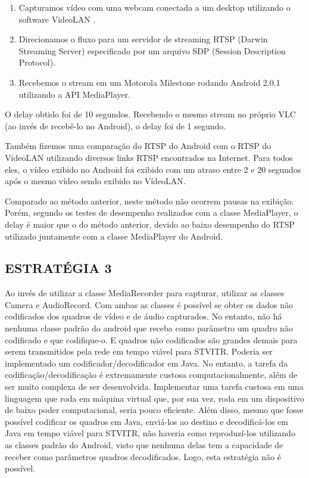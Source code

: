 \documentclass{acm_proc_article-sp}
\begin{document}
\begin{enumerate}
 \item Capturamos vídeo com uma webcam conectada a um desktop utilizando o software VideoLAN .
 \item Direcionamos o fluxo para um servidor de streaming RTSP (Darwin Streaming Server) especificado por um arquivo SDP (Session Description Protocol).
 \item Recebemos o stream em um Motorola Milestone rodando Android 2.0.1 utilizando a API MediaPlayer.
\end{enumerate}

O delay obtido foi de 10 segundos. Recebendo o mesmo stream no próprio VLC (ao invés de recebê-lo no Android), o delay foi de 1 segundo.	 	 	

Também fizemos uma comparação do RTSP do Android com o RTSP do VideoLAN utilizando diversos links RTSP encontrados na Internet. Para todos eles, o vídeo exibido no Android foi exibido com um atraso entre 2 e 20 segundos após o mesmo vídeo sendo exibido no VídeoLAN.

Comparado ao método anterior, neste método não ocorrem pausas na exibição. Porém, segundo os testes de desempenho realizados com a classe MediaPlayer, o delay é maior que o do método anterior, devido ao baixo desempenho do RTSP utilizado juntamente com a classe MediaPlayer do Android.

\subsection{ESTRATÉGIA 3}

Ao invés de utilizar a classe MediaRecorder para capturar, utilizar as classes Camera e AudioRecord. Com ambas as classes é possível se obter os dados não codificados dos quadros de vídeo e de áudio capturados. No entanto, não há nenhuma classe padrão do android que receba como parâmetro um quadro não codificado e que codifique-o. E quadros não codificados são grandes demais para serem transmitidos pela rede em tempo viável para STVITR. Poderia ser implementado um codificador/decodificador em Java. No entanto, a tarefa da codificação/decodificação é extremamente custosa computacionalmente, além de ser muito complexa de ser desenvolvida. Implementar uma tarefa custosa em uma linguagem que roda em máquina virtual que, por sua vez, roda em um dispositivo de baixo poder computacional, seria pouco eficiente. Além disso, mesmo que fosse possível codificar os quadros em Java, enviá-los ao destino e decodificá-los em Java em tempo viável para STVITR, não haveria como reproduzí-los utilizando as classes padrão do Android, visto que nenhuma delas tem a capacidade de receber como parâmetros quadros decodificados. Logo, esta estratégia não é possível.
\end{document}
